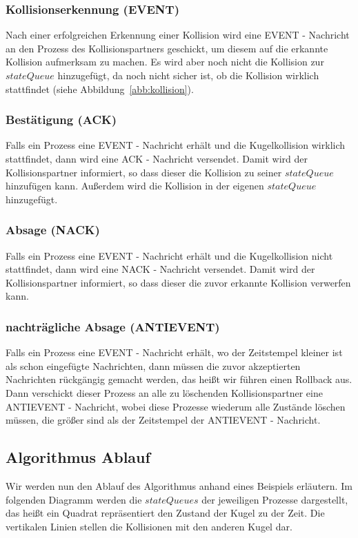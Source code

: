 \documentclass[a4paper, 10pt, openright, parskip, chapterprefix]{scrreprt}
\begin{document}
\subsubsection*{Kollisionserkennung (EVENT)} 

Nach einer erfolgreichen Erkennung einer Kollision wird eine EVENT - Nachricht an den Prozess des Kollisionspartners geschickt, um
diesem auf die erkannte Kollision aufmerksam zu machen. Es wird aber noch nicht die Kollision zur $stateQueue$ hinzugefügt, da noch 
nicht sicher ist, ob die Kollision wirklich stattfindet (siehe Abbildung~\ref{abb:kollision}). 
\subsubsection*{Bestätigung (ACK)} 

Falls ein Prozess eine EVENT - Nachricht erhält und die Kugelkollision wirklich stattfindet, dann wird eine ACK - Nachricht versendet. Damit wird der Kollisionspartner informiert, so dass dieser die Kollision zu seiner $stateQueue$ hinzufügen kann. Außerdem wird die Kollision in der eigenen $stateQueue$ hinzugefügt.

\subsubsection*{Absage (NACK)} 

Falls ein Prozess eine EVENT - Nachricht erhält und die Kugelkollision nicht stattfindet, dann wird eine NACK - Nachricht versendet. Damit wird der Kollisionspartner informiert, so dass dieser die zuvor erkannte Kollision verwerfen kann.

\subsubsection*{nachträgliche Absage (ANTIEVENT)} 

Falls ein Prozess eine EVENT - Nachricht erhält, wo der Zeitstempel kleiner ist als schon eingefügte Nachrichten, dann müssen die zuvor akzeptierten Nachrichten rückgängig gemacht werden, das heißt wir führen einen Rollback aus. Dann verschickt dieser Prozess an alle zu löschenden Kollisionspartner eine ANTIEVENT - Nachricht, wobei diese Prozesse wiederum alle Zustände löschen müssen, die größer sind als der Zeitstempel der ANTIEVENT - Nachricht. 

\subsection{Algorithmus Ablauf}
Wir werden nun den Ablauf des Algorithmus anhand eines Beispiels erläutern. Im folgenden Diagramm  werden die $stateQueues$ der jeweiligen Prozesse dargestellt, das heißt ein Quadrat repräsentiert den Zustand der Kugel zu der Zeit. Die vertikalen Linien stellen die Kollisionen mit den anderen Kugel dar. 
\end{document}
